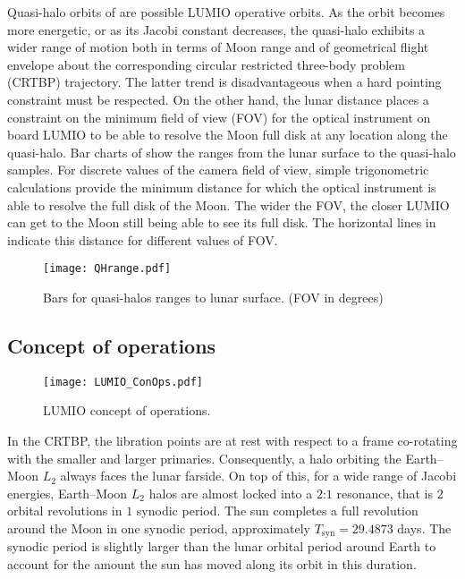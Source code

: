 Quasi-halo orbits of  are possible LUMIO operative orbits. As the orbit becomes more energetic, or as its Jacobi constant decreases, the quasi-halo exhibits a wider range of motion both in terms of Moon range and of geometrical flight envelope about the corresponding circular restricted three-body problem (CRTBP) trajectory. The latter trend is disadvantageous when a hard pointing constraint must be respected. On the other hand, the lunar distance places a constraint on the minimum field of view (FOV) for the optical instrument on board LUMIO to be able to resolve the Moon full disk at any location along the quasi-halo. Bar charts of  show the ranges from the lunar surface to the quasi-halo samples. For discrete values of the camera field of view, simple trigonometric calculations provide the minimum distance for which the optical instrument is able to resolve the full disk of the Moon. The wider the FOV, the closer LUMIO can get to the Moon still being able to see its full disk. The horizontal lines in  indicate this distance for different values of FOV.
%
\begin{figure}[h!]
	\centering
	\texttt{[image: QHrange.pdf]}
	\caption{Bars for quasi-halos ranges to lunar surface. (FOV in degrees)}
	\label{fig:QHranges}
\end{figure}
%


\subsection{Concept of operations}\label{subsec:CONOPS}
%
\begin{figure}[b!]
	\centering
	\texttt{[image: LUMIO\_ConOps.pdf]}
	\caption{LUMIO concept of operations.}
	\label{fig:CONOPS}
\end{figure}
%
In the {CRTBP}, the libration points are at rest with respect to a frame co-rotating with the smaller and larger primaries. Consequently, a halo orbiting the Earth--Moon $L_2$ always faces the lunar farside. On top of this, for a wide range of Jacobi energies, Earth--Moon $L_2$ halos are almost locked into a $2$:$1$ resonance, that is $2$ orbital revolutions in $1$ synodic period. The sun completes a full revolution around the Moon in one synodic period, approximately $T_{\textrm{syn}} = 29.4873$ days. The synodic period is slightly larger than the lunar orbital period around Earth to account for the amount the sun has moved along its orbit in this duration.


